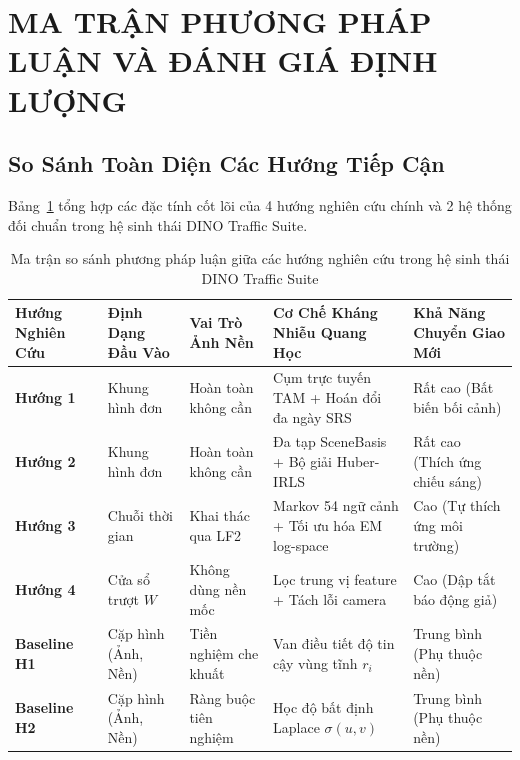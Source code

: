 \documentclass[11pt,a4paper]{article}
\begin{document}
\section{MA TRẬN PHƯƠNG PHÁP LUẬN VÀ ĐÁNH GIÁ ĐỊNH LƯỢNG}

\subsection{So Sánh Toàn Diện Các Hướng Tiếp Cận}
Bảng~\ref{tab:method_comparison} tổng hợp các đặc tính cốt lõi của 4 hướng nghiên cứu chính và 2 hệ thống đối chuẩn trong hệ sinh thái DINO Traffic Suite.

\begin{table}[htbp]
\centering
\small
\caption{Ma trận so sánh phương pháp luận giữa các hướng nghiên cứu trong hệ sinh thái DINO Traffic Suite}
\label{tab:method_comparison}
\begin{tabular}{>{\raggedright\arraybackslash}p{2.2cm} >{\raggedright\arraybackslash}p{2.5cm} >{\raggedright\arraybackslash}p{2.5cm} >{\raggedright\arraybackslash}p{4.2cm} >{\raggedright\arraybackslash}p{3.0cm}}
\toprule
\textbf{Hướng Nghiên Cứu} & \textbf{Định Dạng Đầu Vào} & \textbf{Vai Trò Ảnh Nền} & \textbf{Cơ Chế Kháng Nhiễu Quang Học} & \textbf{Khả Năng Chuyển Giao Mới} \\
\midrule
\textbf{Hướng 1} & Khung hình đơn & Hoàn toàn không cần & Cụm trực tuyến TAM + Hoán đổi đa ngày SRS & Rất cao (Bất biến bối cảnh) \\
\addlinespace
\textbf{Hướng 2} & Khung hình đơn & Hoàn toàn không cần & Đa tạp SceneBasis + Bộ giải Huber-IRLS & Rất cao (Thích ứng chiếu sáng) \\
\addlinespace
\textbf{Hướng 3} & Chuỗi thời gian & Khai thác qua LF2 & Markov 54 ngữ cảnh + Tối ưu hóa EM log-space & Cao (Tự thích ứng môi trường) \\
\addlinespace
\textbf{Hướng 4} & Cửa sổ trượt $W$ & Không dùng nền mốc & Lọc trung vị feature + Tách lỗi camera & Cao (Dập tắt báo động giả) \\
\addlinespace
\textbf{Baseline H1} & Cặp hình (Ảnh, Nền) & Tiền nghiệm che khuất & Van điều tiết độ tin cậy vùng tĩnh $r_i$ & Trung bình (Phụ thuộc nền) \\
\addlinespace
\textbf{Baseline H2} & Cặp hình (Ảnh, Nền) & Ràng buộc tiên nghiệm & Học độ bất định Laplace $\sigma(u, v)$ & Trung bình (Phụ thuộc nền) \\
\bottomrule
\end{tabular}
\end{table}
\end{document}
